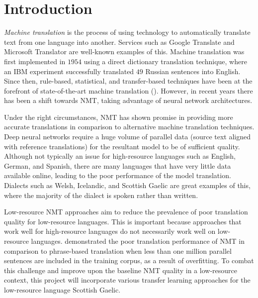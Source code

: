 \chapter{Introduction}
\label{introduction}

\textit{Machine translation} is the process of using technology to automatically translate text from one language into another. Services such as Google Translate and Microsoft Translator are well-known examples of this. 
Machine translation was first implemented in $1954$ using a direct dictionary translation technique, where an IBM experiment successfully translated $49$ Russian sentences into English.
Since then, rule-based, statistical, and transfer-based techniques have been at the forefront of state-of-the-art machine translation (\cite{chiang_phrase_2005}). However, in recent years there has been a shift towards \Gls{NMT}, taking advantage of neural network architectures.

Under the right circumstances, \acrshort{NMT} has shown promise in providing more accurate translations in comparison to alternative machine translation techniques. Deep neural networks require a huge volume of parallel data (source text aligned with reference translations) for the resultant model to be of sufficient quality. Although not typically an issue for high-resource languages such as English, German, and Spanish, there are many languages that have very little data available online, leading to the poor performance of the model translation. Dialects such as Welsh, Icelandic, and Scottish Gaelic are great examples of this, where the majority of the dialect is spoken rather than written.

Low-resource \acrshort{NMT} approaches aim to reduce the prevalence of poor translation quality for low-resource languages.
This is important because approaches that work well for high-resource languages do not necessarily work well on low-resource languages. \cite{koehn_six_2017} demonstrated the poor translation performance of \acrshort{NMT} in comparison to phrase-based translation when less than one million parallel sentences are included in the training corpus, as a result of overfitting. To combat this challenge and improve upon the baseline \acrshort{NMT} quality in a low-resource context, this project will incorporate various transfer learning approaches for the low-resource language Scottish Gaelic.



